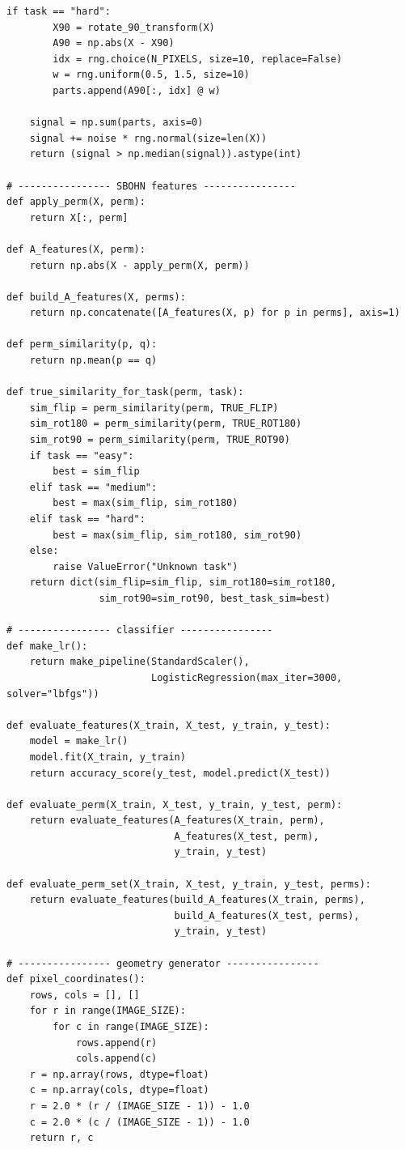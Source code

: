 \documentclass[11pt,a4paper]{report}
\begin{document}
\begin{lstlisting}[style=python,caption={Unified Python code for Meta-SBOHN v5/v6 tests.}]
    if task == "hard":
        X90 = rotate_90_transform(X)
        A90 = np.abs(X - X90)
        idx = rng.choice(N_PIXELS, size=10, replace=False)
        w = rng.uniform(0.5, 1.5, size=10)
        parts.append(A90[:, idx] @ w)

    signal = np.sum(parts, axis=0)
    signal += noise * rng.normal(size=len(X))
    return (signal > np.median(signal)).astype(int)

# ---------------- SBOHN features ----------------
def apply_perm(X, perm):
    return X[:, perm]

def A_features(X, perm):
    return np.abs(X - apply_perm(X, perm))

def build_A_features(X, perms):
    return np.concatenate([A_features(X, p) for p in perms], axis=1)

def perm_similarity(p, q):
    return np.mean(p == q)

def true_similarity_for_task(perm, task):
    sim_flip = perm_similarity(perm, TRUE_FLIP)
    sim_rot180 = perm_similarity(perm, TRUE_ROT180)
    sim_rot90 = perm_similarity(perm, TRUE_ROT90)
    if task == "easy":
        best = sim_flip
    elif task == "medium":
        best = max(sim_flip, sim_rot180)
    elif task == "hard":
        best = max(sim_flip, sim_rot180, sim_rot90)
    else:
        raise ValueError("Unknown task")
    return dict(sim_flip=sim_flip, sim_rot180=sim_rot180,
                sim_rot90=sim_rot90, best_task_sim=best)

# ---------------- classifier ----------------
def make_lr():
    return make_pipeline(StandardScaler(),
                         LogisticRegression(max_iter=3000, solver="lbfgs"))

def evaluate_features(X_train, X_test, y_train, y_test):
    model = make_lr()
    model.fit(X_train, y_train)
    return accuracy_score(y_test, model.predict(X_test))

def evaluate_perm(X_train, X_test, y_train, y_test, perm):
    return evaluate_features(A_features(X_train, perm),
                             A_features(X_test, perm),
                             y_train, y_test)

def evaluate_perm_set(X_train, X_test, y_train, y_test, perms):
    return evaluate_features(build_A_features(X_train, perms),
                             build_A_features(X_test, perms),
                             y_train, y_test)

# ---------------- geometry generator ----------------
def pixel_coordinates():
    rows, cols = [], []
    for r in range(IMAGE_SIZE):
        for c in range(IMAGE_SIZE):
            rows.append(r)
            cols.append(c)
    r = np.array(rows, dtype=float)
    c = np.array(cols, dtype=float)
    r = 2.0 * (r / (IMAGE_SIZE - 1)) - 1.0
    c = 2.0 * (c / (IMAGE_SIZE - 1)) - 1.0
    return r, c


\end{lstlisting}
\end{document}
